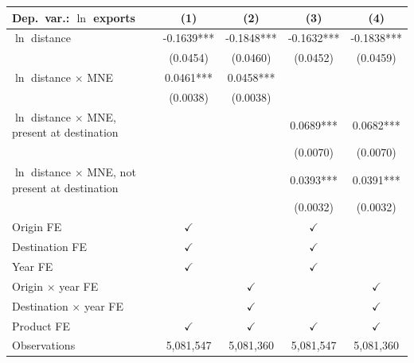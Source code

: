 \begin{tabular}{lcccc} \hline
Dep.\ var.: $\ln$ exports & (1) & (2) & (3) & (4) \\ \hline
$\ln$ distance & -0.1639*** & -0.1848*** & -0.1632*** & -0.1838*** \\
 & (0.0454) & (0.0460) & (0.0452) & (0.0459) \\
$\ln$ distance $\times$ MNE & 0.0461*** & 0.0458*** &  &  \\
 & (0.0038) & (0.0038) &  &  \\
$\ln$ distance $\times$ MNE, present at destination &  &  & 0.0689*** & 0.0682*** \\
 &  &  & (0.0070) & (0.0070) \\
$\ln$ distance $\times$ MNE, not present at destination &  &  & 0.0393*** & 0.0391*** \\
 &  &  & (0.0032) & (0.0032) \\
\hline
Origin FE & $\checkmark$ &  & $\checkmark$ &  \\
Destination FE & $\checkmark$ &  & $\checkmark$ &  \\
Year FE & $\checkmark$ &  & $\checkmark$ &  \\
Origin $\times$ year FE &  & $\checkmark$ &  & $\checkmark$ \\
Destination $\times$ year FE &  & $\checkmark$ &  & $\checkmark$ \\
Product FE & $\checkmark$ & $\checkmark$ & $\checkmark$ & $\checkmark$ \\
\hline
Observations & 5,081,547 & 5,081,360 & 5,081,547 & 5,081,360 \\
\hline
\end{tabular}
